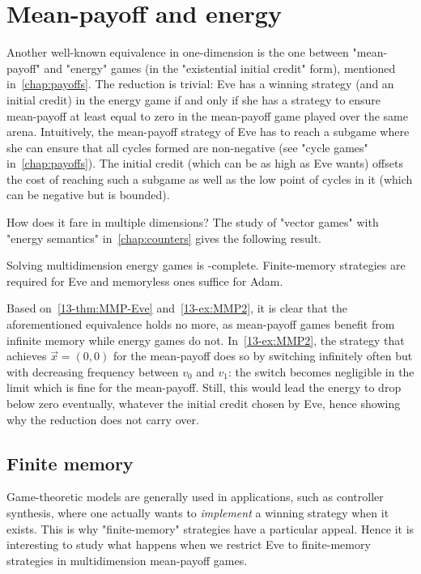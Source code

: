 \section{Mean-payoff and energy}
\label{13-sec:MPEG}

Another well-known equivalence in one-dimension is the one between "mean-payoff" and "energy" games (in the "existential initial credit" form), mentioned in~\cref{chap:payoffs}. The reduction is trivial: Eve has a winning strategy (and an initial credit) in the energy game if and only if she has a strategy to ensure mean-payoff at least equal to zero in the mean-payoff game played over the same arena. Intuitively, the mean-payoff strategy of Eve has to reach a subgame where she can ensure that all cycles formed are non-negative (see "cycle games" in~\cref{chap:payoffs}). The initial credit (which can be as high as Eve wants) offsets the cost of reaching such a subgame as well as the low point of cycles in it (which can be negative but is bounded).

How does it fare in multiple dimensions? The study of "vector games" with "energy semantics" in~\cref{chap:counters} gives the following result.

\begin{theorem}
\label{13-thm:MEG}
Solving multidimension energy games is \coNP-complete. Finite\--mem\-ory strategies are required for Eve and memoryless ones suffice for Adam.
\end{theorem} 

Based on~\cref{13-thm:MMP-Eve} and~\cref{13-ex:MMP2}, it is clear that the aforementioned equivalence holds no more, as mean-payoff games benefit from infinite memory while energy games do not. In~\cref{13-ex:MMP2}, the strategy that achieves $\vec{x} = (0, 0)$ for the mean-payoff does so by switching infinitely often but with decreasing frequency between $v_0$ and $v_1$: the switch becomes negligible in the limit which is fine for the mean-payoff. Still, this would lead the energy to drop below zero eventually, whatever the initial credit chosen by Eve, hence showing why the reduction does not carry over.


\subsection{Finite memory}

Game-theoretic models are generally used in applications, such as controller synthesis, where one actually wants to \textit{implement} a winning strategy when it exists. This is why "finite-memory" strategies have a particular appeal. Hence it is interesting to study what happens when we restrict Eve to finite-memory strategies in multidimension mean-payoff games. 

